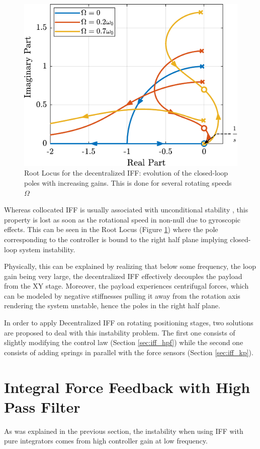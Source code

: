 \documentclass{ISMA_USD2020}
\begin{document}
\begin{figure}[htbp]
\centering
\includegraphics[scale=1]{figs/root_locus_pure_iff.pdf}
\caption{\label{fig:root_locus_pure_iff}Root Locus for the decentralized IFF: evolution of the closed-loop poles with increasing gains. This is done for several rotating speeds \(\Omega\)}
\end{figure}

Whereas collocated IFF is usually associated with unconditional stability \cite{preumont91_activ}, this property is lost as soon as the rotational speed in non-null due to gyroscopic effects.
This can be seen in the Root Locus (Figure \ref{fig:root_locus_pure_iff}) where the pole corresponding to the controller is bound to the right half plane implying closed-loop system instability.

Physically, this can be explained by realizing that below some frequency, the loop gain being very large, the decentralized IFF effectively decouples the payload from the XY stage.
Moreover, the payload experiences centrifugal forces, which can be modeled by negative stiffnesses pulling it away from the rotation axis rendering the system unstable, hence the poles in the right half plane.

In order to apply Decentralized IFF on rotating positioning stages, two solutions are proposed to deal with this instability problem.
The first one consists of slightly modifying the control law (Section \ref{sec:iff_hpf}) while the second one consists of adding springs in parallel with the force sensors (Section \ref{sec:iff_kp}).

\section{Integral Force Feedback with High Pass Filter}
\label{sec:orgaa5d9a8}
\label{sec:iff_hpf}
As was explained in the previous section, the instability when using IFF with pure integrators comes from high controller gain at low frequency.
\end{document}
